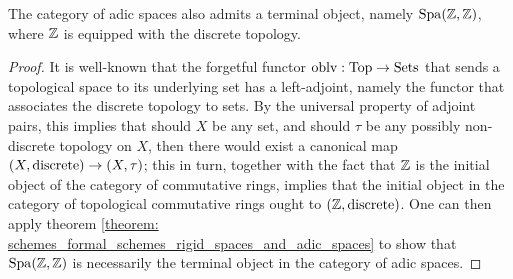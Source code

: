             \begin{proposition} \label{prop: terminal_adic_space}
                The category of adic spaces also admits a terminal object, namely $\mathrm{Spa}(\mathbb{Z}, \mathbb{Z})$, where $\mathbb{Z}$ is equipped with the discrete topology.
            \end{proposition}
                \begin{proof}
                    It is well-known that the forgetful functor $\mathrm{oblv}: \mathrm{Top} \to \mathrm{Sets}$ that sends a topological space to its underlying set has a left-adjoint, namely the functor that associates the discrete topology to sets. By the universal property of adjoint pairs, this implies that should $X$ be any set, and should $\tau$ be any possibly non-discrete topology on $X$, then there would exist a canonical map $(X, \mathrm{discrete}) \to (X, \tau)$; this in turn, together with the fact that $\mathbb{Z}$ is the initial object of the category of commutative rings, implies that the initial object in the category of topological commutative rings ought to $(\mathbb{Z}, \mathrm{discrete})$. One can then apply theorem \ref{theorem: schemes_formal_schemes_rigid_spaces_and_adic_spaces} to show that $\mathrm{Spa}(\mathbb{Z}, \mathbb{Z})$ is necessarily the terminal object in the category of adic spaces. 
                \end{proof}
        

